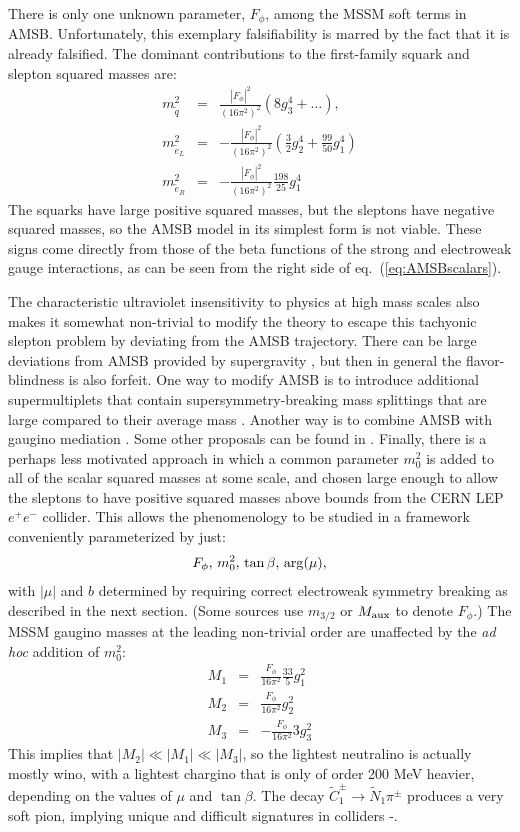 \documentclass[12pt]{article}
\def\beq{\begin{eqnarray}}
\def\eeq{\end{eqnarray}}
\def\stilde{\widetilde}
\def\mAMSB{F_\phi}
\begin{document}
There is only one unknown parameter, $\mAMSB$, among the MSSM soft terms 
in AMSB. Unfortunately, this exemplary falsifiability is 
marred by the fact that it is already falsified. The dominant 
contributions to the first-family squark and slepton squared masses are:
\beq
m^2_{\tilde q} &= & \frac{|\mAMSB|^2}{(16 \pi^2)^2} 
\left (8 g_3^4  + \ldots \right ),
\\
m^2_{\tilde e_L} &= & -\frac{|\mAMSB|^2}{(16 \pi^2)^2} 
\left (\frac{3}{2} g_2^4 + \frac{99}{50} g_1^4 \right )
\\
m^2_{\tilde e_R} &= & 
-\frac{|\mAMSB|^2}{(16 \pi^2)^2} \frac{198}{25} g_1^4
\eeq
The squarks have large positive squared masses, but the sleptons have 
negative squared masses, so the AMSB model in its simplest form is not 
viable. These signs come directly from those of the beta functions of the 
strong and electroweak gauge interactions, as can be seen from the 
right side of eq.~(\ref{eq:AMSBscalars}).

The characteristic ultraviolet insensitivity to physics at high mass 
scales also makes it somewhat non-trivial to modify the theory to escape 
this tachyonic slepton problem by deviating from the AMSB trajectory. There 
can be large deviations from AMSB provided by supergravity 
\cite{isAMSBrobust}, but then in general the flavor-blindness is also 
forfeit. One way to modify AMSB is to introduce additional supermultiplets 
that contain supersymmetry-breaking mass splittings that are large 
compared to their average mass \cite{AMSBlightstates}. Another way is to 
combine AMSB with gaugino mediation \cite{AMSBhybrid}. Some other 
proposals can be found in \cite{otherAMSBattempts}. Finally, there is a 
perhaps less motivated approach in which a common 
parameter $m_0^2$ is added to all of the scalar squared masses at some 
scale, and chosen large enough to allow the sleptons to have positive 
squared masses above bounds from the CERN LEP $e^+e^-$ collider. 
This allows the phenomenology to be 
studied in a framework conveniently parameterized by just:
\beq
\mAMSB,\, m^2_0,\, \tan\beta,\, {\rm arg}(\mu),
\eeq 
with $|\mu|$ and $b$ determined by requiring correct electroweak symmetry 
breaking as described in the next section. (Some sources use $m_{3/2}$ or 
$M_{\rm aux}$ to denote $ \mAMSB$.) The MSSM gaugino masses at the leading 
non-trivial order are unaffected by the {\it ad hoc} addition of $m_0^2$:
\beq
M_1 &=& \frac{\mAMSB}{16 \pi^2} \frac{33}{5} g_1^2
\\
M_2 &=& \frac{\mAMSB}{16 \pi^2} g_2^2
\\
M_3 &=& -\frac{\mAMSB}{16 \pi^2} 3 g_3^2
\eeq
This implies that $|M_2| \ll |M_1| \ll |M_3|$, so the lightest neutralino 
is actually mostly wino, with a lightest chargino that is only of order 
200 MeV heavier, depending on the values of $\mu$ and $\tan\beta$.
The decay $\stilde C_1^\pm \rightarrow \stilde N_1 \pi^\pm$ 
produces a very soft pion, implying
unique and difficult signatures in colliders 
\cite{Chen:1996ap}-\cite{AMSBphenothree}. 
\end{document}
